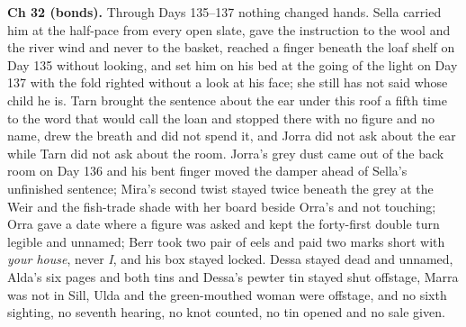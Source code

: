 \documentclass{design/chronicle}
\begin{document}
{\textbf{Ch 32 (bonds).} Through Days 135–137 nothing changed hands. Sella carried him at the half-pace from every open slate, gave the instruction to the wool and the river wind and never to the basket, reached a finger beneath the loaf shelf on Day 135 without looking, and set him on his bed at the going of the light on Day 137 with the fold righted without a look at his face; she still has not said whose child he is. Tarn brought the sentence about the ear under this roof a fifth time to the word that would call the loan and stopped there with no figure and no name, drew the breath and did not spend it, and Jorra did not ask about the ear while Tarn did not ask about the room. Jorra’s grey dust came out of the back room on Day 136 and his bent finger moved the damper ahead of Sella’s unfinished sentence; Mira’s second twist stayed twice beneath the grey at the Weir and the fish-trade shade with her board beside Orra’s and not touching; Orra gave a date where a figure was asked and kept the forty-first double turn legible and unnamed; Berr took two pair of eels and paid two marks short with \emph{your house}, never \emph{I}, and his box stayed locked. Dessa stayed dead and unnamed, Alda’s six pages and both tins and Dessa’s pewter tin stayed shut offstage, Marra was not in Sill, Ulda and the green-mouthed woman were offstage, and no sixth sighting, no seventh hearing, no knot counted, no tin opened and no sale given.

}
\end{document}

